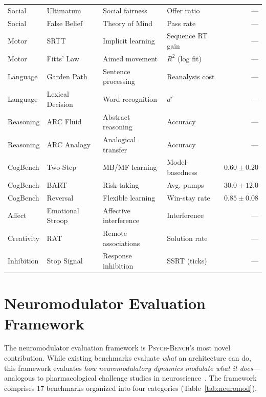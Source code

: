 \documentclass[11pt,letterpaper]{article}
\newcommand{\psychbench}{\textsc{Psych-Bench}}
\begin{document}
\begin{table}[p]
\begin{tabular}{@{}llllr@{}}
Social & Ultimatum & Social fairness & Offer ratio & --- \\
Social & False Belief & Theory of Mind & Pass rate & --- \\
\midrule
Motor & SRTT & Implicit learning & Sequence RT gain & --- \\
Motor & Fitts' Law & Aimed movement & $R^2$ (log fit) & --- \\
\midrule
Language & Garden Path & Sentence processing & Reanalysis cost & --- \\
Language & Lexical Decision & Word recognition & $d'$ & --- \\
\midrule
Reasoning & ARC Fluid & Abstract reasoning & Accuracy & --- \\
Reasoning & ARC Analogy & Analogical transfer & Accuracy & --- \\
\midrule
CogBench & Two-Step & MB/MF learning & Model-basedness & $0.60 \pm 0.20$ \\
CogBench & BART & Risk-taking & Avg. pumps & $30.0 \pm 12.0$ \\
CogBench & Reversal & Flexible learning & Win-stay rate & $0.85 \pm 0.08$ \\
\midrule
Affect & Emotional Stroop & Affective interference & Interference & --- \\
Creativity & RAT & Remote associations & Solution rate & --- \\
Inhibition & Stop Signal & Response inhibition & SSRT (ticks) & --- \\
\bottomrule
\end{tabular}
\end{table}

\section{Neuromodulator Evaluation Framework}
\label{sec:neuromod}

The neuromodulator evaluation framework is \psychbench{}'s most novel contribution. While existing benchmarks evaluate \emph{what} an architecture can do, this framework evaluates \emph{how neuromodulatory dynamics modulate what it does}---analogous to pharmacological challenge studies in neuroscience~\citep{doya2002metalearning}. The framework comprises 17 benchmarks organized into four categories (Table~\ref{tab:neuromod}).
\end{document}
